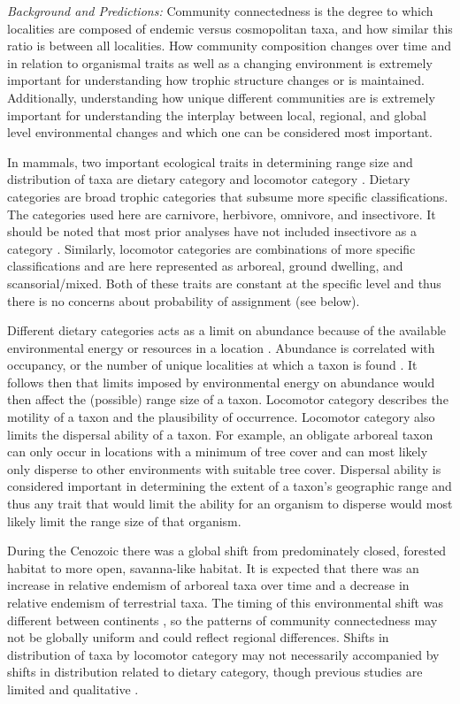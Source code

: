 \documentclass[12pt,letterpaper]{article}
\begin{document}
\textit{Background and Predictions:}
Community connectedness is the degree to which localities are composed of endemic versus cosmopolitan taxa, and how similar this ratio is between all localities. How community composition changes over time and in relation to organismal traits as well as a changing environment is extremely important for understanding how trophic structure changes or is maintained. Additionally, understanding how unique different communities are is extremely important for understanding the interplay between local, regional, and global level environmental changes and which one can be considered most important. 

In mammals, two important ecological traits in determining range size and distribution of taxa are dietary category and locomotor category \citep{Jernvall2004,Lyons2005,Lyons2010}. Dietary categories are broad trophic categories that subsume more specific classifications. The categories used here are carnivore, herbivore, omnivore, and insectivore. It should be noted that most prior analyses have not included insectivore as a category \citep{Jernvall2004,Price2012}. Similarly, locomotor categories are combinations of more specific classifications and are here represented as arboreal, ground dwelling, and scansorial/mixed. Both of these traits are constant at the specific level and thus there is no concerns about probability of assignment (see below).

Different dietary categories acts as a limit on abundance because of the available environmental energy or resources in a location \citep{VanValen1989,Brown1987,Damuth1979,Silva1997,Janis2000}. Abundance is correlated with occupancy, or the number of unique localities at which a taxon is found \citep{Jernvall2002,Fortelius2002,Brown1984}. It follows then that limits imposed by environmental energy on abundance would then affect the (possible) range size of a taxon. Locomotor category describes the motility of a taxon and the plausibility of occurrence. Locomotor category also limits the dispersal ability of a taxon. For example, an obligate arboreal taxon can only occur in locations with a minimum of tree cover and can most likely only disperse to other environments with suitable tree cover. Dispersal ability is considered important in determining the extent of a taxon's geographic range \citep{Birand2012,Jablonski2006a,Gaston2009} and thus any trait that would limit the ability for an organism to disperse would most likely limit the range size of that organism.

During the Cenozoic there was a global shift from predominately closed, forested habitat to more open, savanna-like habitat. It is expected that there was an increase in relative endemism of arboreal taxa over time and a decrease in relative endemism of terrestrial taxa. The timing of this environmental shift was different between continents \citep{Stromberg2005,Stromberg2013}, so the patterns of community connectedness may not be globally uniform and could reflect regional differences. Shifts in distribution of taxa by locomotor category may not necessarily accompanied by shifts in distribution related to dietary category, though previous studies are limited and qualitative \citep{Janis1993a}. 
\end{document}
